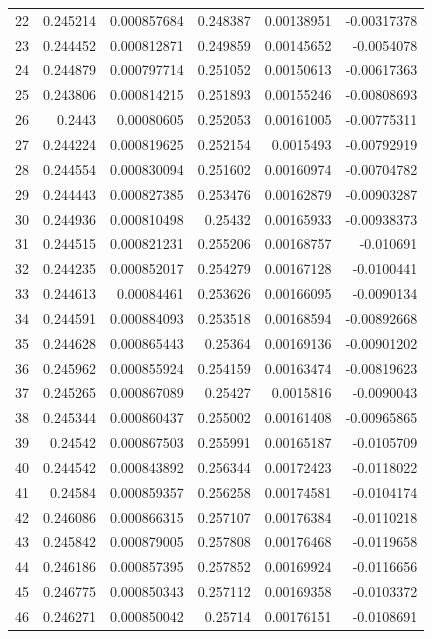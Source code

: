 \documentclass[10pt]{article}
\begin{document}
\begin{longtable}{rrrrrr}
22 & 0.245214 & 0.000857684 & 0.248387 & 0.00138951 & -0.00317378 \\
23 & 0.244452 & 0.000812871 & 0.249859 & 0.00145652 & -0.0054078 \\
24 & 0.244879 & 0.000797714 & 0.251052 & 0.00150613 & -0.00617363 \\
25 & 0.243806 & 0.000814215 & 0.251893 & 0.00155246 & -0.00808693 \\
26 & 0.2443 & 0.00080605 & 0.252053 & 0.00161005 & -0.00775311 \\
27 & 0.244224 & 0.000819625 & 0.252154 & 0.0015493 & -0.00792919 \\
28 & 0.244554 & 0.000830094 & 0.251602 & 0.00160974 & -0.00704782 \\
29 & 0.244443 & 0.000827385 & 0.253476 & 0.00162879 & -0.00903287 \\
30 & 0.244936 & 0.000810498 & 0.25432 & 0.00165933 & -0.00938373 \\
31 & 0.244515 & 0.000821231 & 0.255206 & 0.00168757 & -0.010691 \\
32 & 0.244235 & 0.000852017 & 0.254279 & 0.00167128 & -0.0100441 \\
33 & 0.244613 & 0.00084461 & 0.253626 & 0.00166095 & -0.0090134 \\
34 & 0.244591 & 0.000884093 & 0.253518 & 0.00168594 & -0.00892668 \\
35 & 0.244628 & 0.000865443 & 0.25364 & 0.00169136 & -0.00901202 \\
36 & 0.245962 & 0.000855924 & 0.254159 & 0.00163474 & -0.00819623 \\
37 & 0.245265 & 0.000867089 & 0.25427 & 0.0015816 & -0.0090043 \\
38 & 0.245344 & 0.000860437 & 0.255002 & 0.00161408 & -0.00965865 \\
39 & 0.24542 & 0.000867503 & 0.255991 & 0.00165187 & -0.0105709 \\
40 & 0.244542 & 0.000843892 & 0.256344 & 0.00172423 & -0.0118022 \\
41 & 0.24584 & 0.000859357 & 0.256258 & 0.00174581 & -0.0104174 \\
42 & 0.246086 & 0.000866315 & 0.257107 & 0.00176384 & -0.0110218 \\
43 & 0.245842 & 0.000879005 & 0.257808 & 0.00176468 & -0.0119658 \\
44 & 0.246186 & 0.000857395 & 0.257852 & 0.00169924 & -0.0116656 \\
45 & 0.246775 & 0.000850343 & 0.257112 & 0.00169358 & -0.0103372 \\
46 & 0.246271 & 0.000850042 & 0.25714 & 0.00176151 & -0.0108691 \\

\end{longtable}
\end{document}
